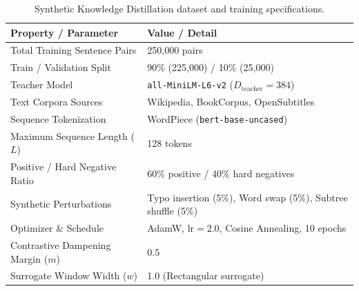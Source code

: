 \documentclass[11pt, conference, compsoc, twoside]{IEEEtran}
\begin{document}
\begin{table}[t]
\begin{center}
{\caption{Synthetic Knowledge Distillation dataset and training specifications.}\label{tab:dataset_specs}}


\begin{tabular}{ll}
\toprule
\textbf{Property / Parameter} & \textbf{Value / Detail} \\
\midrule
Total Training Sentence Pairs & 250,000 pairs \\
Train / Validation Split & 90\% (225,000) / 10\% (25,000) \\
Teacher Model & \texttt{all-MiniLM-L6-v2} ($D_{\text{teacher}}=384$) \\
Text Corpora Sources & Wikipedia, BookCorpus, OpenSubtitles \\
Sequence Tokenization & WordPiece (\texttt{bert-base-uncased}) \\
Maximum Sequence Length ($L$) & 128 tokens \\
Positive / Hard Negative Ratio & 60\% positive / 40\% hard negatives \\
Synthetic Perturbations & Typo insertion (5\%), Word swap (5\%), Subtree shuffle (5\%) \\
Optimizer \& Schedule & AdamW, $\text{lr}=2.0$, Cosine Annealing, 10 epochs \\
Contrastive Dampening Margin ($m$) & 0.5 \\
Surrogate Window Width ($w$) & 1.0 (Rectangular surrogate) \\
\bottomrule
\end{tabular}
\end{center}
\end{table}
\end{document}
